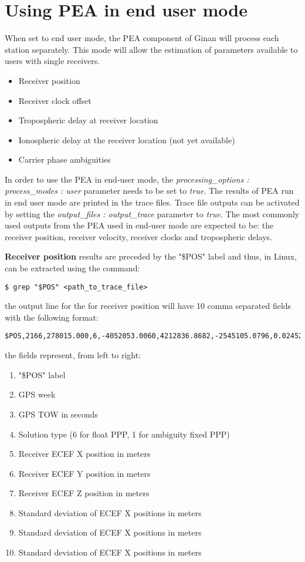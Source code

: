 \chapter{Using PEA in end user mode}
\label{ch:pea_user_mode}
When set to end user mode, the PEA component of Ginan will process each station separately. This mode will allow the estimation of parameters available to users with single receivers. 
\begin{itemize}
	\item Receiver position
	\item Receiver clock offset
	\item Tropospheric delay at receiver location
	\item Ionospheric delay at the receiver location (not yet available)
	\item Carrier phase ambiguities
\end{itemize}
In order to use the PEA in end-user mode, the \textit{ processing\_options : process\_modes : user} parameter needs to be set to \textit{true}.
The results of PEA run in end user mode are printed in the trace files.
Trace file outputs can be activated by setting the \textit{ output\_files : output\_trace} parameter to \textit{true}.
The most commonly used outputs from the PEA used in end-user mode are expected to be: the receiver position, receiver velocity, receiver clocks and tropospheric delays.

\textbf{Receiver position}  results are preceded by the "\$POS" label and thus, in Linux, can be extracted using the command:
 \begin{lstlisting}
$ grep "$POS" <path_to_trace_file>
\end{lstlisting}
the output line for the for receiver position will have 10 comma separated fields with the following format:
\begin{lstlisting}
$POS,2166,278015.000,6,-4052053.0060,4212836.8682,-2545105.0796,0.0245227,0.0231919,0.0163678
\end{lstlisting}
the fields represent, from left to right:
\begin{enumerate}
	\item  "\$POS" label
	\item  GPS week
	\item  GPS TOW in seconds
	\item  Solution type (6 for float PPP, 1 for ambiguity fixed PPP)
	\item  Receiver ECEF X position in meters
	\item  Receiver ECEF Y position in meters
	\item  Receiver ECEF Z position in meters
	\item  Standard deviation of ECEF X positions in meters
	\item  Standard deviation of ECEF X positions in meters
	\item  Standard deviation of ECEF X positions in meters
\end{enumerate}

